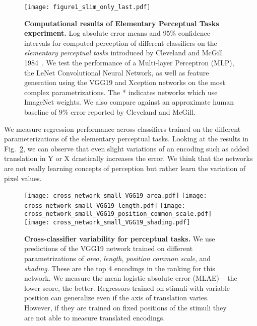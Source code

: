 \begin{figure}[!ht]
	\centering
	\texttt{[image: figure1\_slim\_only\_last.pdf]}
	\caption{\textbf{Computational results of Elementary Perceptual Tasks experiment.} Log absolute error means and 95\% confidence intervals for computed perception of different classifiers on the \emph{elementary perceptual tasks} introduced by Cleveland and McGill 1984~\cite{cleveland_mcgill}. We test the performance of a Multi-layer Perceptron (MLP), the LeNet Convolutional Neural Network, as well as feature generation using the VGG19 and Xception networks on the most complex parametrizations. The * indicates networks which use ImageNet weights. We also compare against an approximate human baseline of $9\%$ error reported by Cleveland and McGill.}
	\label{fig:figure1_results}
\end{figure}

 We measure regression performance across classifiers trained on the different parameterizations of the elementary perceptual tasks. Looking at the results in Fig.~\ref{fig:cross_network}, we can observe that even slight variations of an encoding such as added translation in Y or X drastically increases the error. We think that the networks are not really learning concepts of perception but rather learn the variation of pixel values.

\begin{figure}[!ht]
	\centering
	  \texttt{[image: cross\_network\_small\_VGG19\_area.pdf]}
	  \texttt{[image: cross\_network\_small\_VGG19\_length.pdf]}
	  \texttt{[image: cross\_network\_small\_VGG19\_position\_common\_scale.pdf]}
	  \texttt{[image: cross\_network\_small\_VGG19\_shading.pdf]}
  \caption{\textbf{Cross-classifier variability for perceptual tasks.} We use predictions of the VGG19 network trained on different parametrizations of \emph{area}, \emph{length}, \emph{position common scale}, and \emph{shading}. These are the top 4 encodings in the ranking for this network. We measure the mean logistic absolute error (MLAE) -- the lower score, the better. Regressors trained on stimuli with variable position can generalize even if the axis of translation varies. However, if they are trained on fixed positions of the stimuli they are not able to measure translated encodings.}
	\label{fig:cross_network}
\end{figure}

